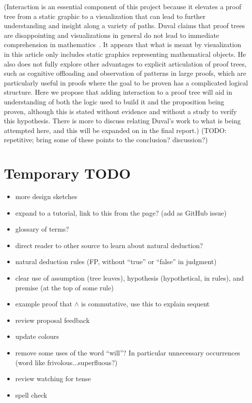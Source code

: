 \documentclass[conference]{IEEEtran}
\begin{document}
(Interaction is an essential component of this project because it elevates a proof tree from a static graphic to a visualization that can lead to further understanding and insight along a variety of paths. Duval claims that proof trees are disappointing and visualizations in general do not lead to immediate comprehension in mathematics~\cite{repvisvis-duval}. It appears that what is meant by visualization in this article only includes static graphics representing mathematical objects. He also does not fully explore other advantages to explicit articulation of proof trees, such as cognitive offloading and observation of patterns in large proofs, which are particularly useful in proofs where the goal to be proven has a complicated logical structure. Here we propose that adding interaction to a proof tree will aid in understanding of both the logic used to build it and the proposition being proven, although this is stated without evidence and without a study to verify this hypothesis. There is more to discuss relating Duval’s work to what is being attempted here, and this will be expanded on in the final report.) (TODO: repetitive; bring some of these points to the conclusion? discussion?)


\section{Temporary TODO}

\begin{itemize}
\item more design sketches
\item expand to a tutorial, link to this from the page? (add as GitHub issue)
\item glossary of terms?
\item direct reader to other source to learn about natural deduction?
\item natural deduction rules (FP, without ``true'' or ``false'' in judgment)
\item clear use of assumption (tree leaves), hypothesis (hypothetical, in rules), and premise (at the top of some rule)
\item example proof that $\wedge$ is commutative, use this to explain sequent
\item review proposal feedback
\item update colours
\item remove some uses of the word ``will''? In particular unnecessary occurrences (word like frivolous...superfluous?)
\item review watching for tense
\item spell check
\end{itemize}
\end{document}

